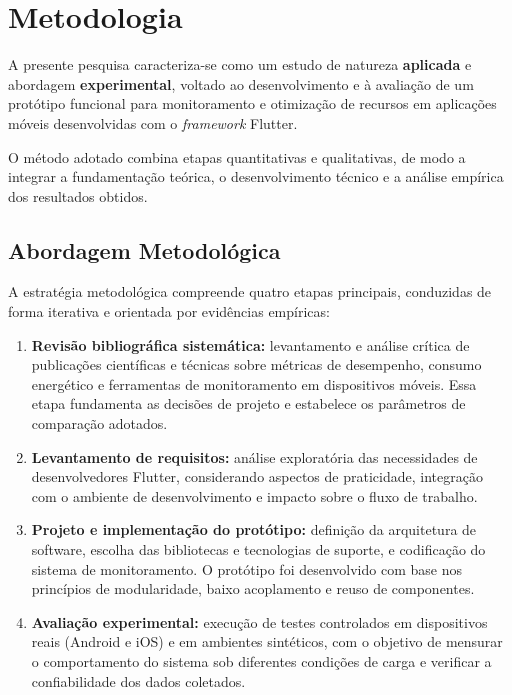 \documentclass[12pt,a4paper,oneside]{abntex2}
\begin{document}
\chapter{Metodologia}

A presente pesquisa caracteriza-se como um estudo de natureza \textbf{aplicada} e abordagem \textbf{experimental}, voltado ao desenvolvimento e à avaliação de um protótipo funcional para monitoramento e otimização de recursos em aplicações móveis desenvolvidas com o \textit{framework} Flutter. 

O método adotado combina etapas quantitativas e qualitativas, de modo a integrar a fundamentação teórica, o desenvolvimento técnico e a análise empírica dos resultados obtidos.

\section{Abordagem Metodológica}

A estratégia metodológica compreende quatro etapas principais, conduzidas de forma iterativa e orientada por evidências empíricas:

\begin{enumerate}
  \item \textbf{Revisão bibliográfica sistemática:} levantamento e análise crítica de publicações científicas e técnicas sobre métricas de desempenho, consumo energético e ferramentas de monitoramento em dispositivos móveis. Essa etapa fundamenta as decisões de projeto e estabelece os parâmetros de comparação adotados. 
  
  \item \textbf{Levantamento de requisitos:} análise exploratória das necessidades de desenvolvedores Flutter, considerando aspectos de praticidade, integração com o ambiente de desenvolvimento e impacto sobre o fluxo de trabalho. 

  \item \textbf{Projeto e implementação do protótipo:} definição da arquitetura de software, escolha das bibliotecas e tecnologias de suporte, e codificação do sistema de monitoramento. O protótipo foi desenvolvido com base nos princípios de modularidade, baixo acoplamento e reuso de componentes. 

  \item \textbf{Avaliação experimental:} execução de testes controlados em dispositivos reais (Android e iOS) e em ambientes sintéticos, com o objetivo de mensurar o comportamento do sistema sob diferentes condições de carga e verificar a confiabilidade dos dados coletados. 
\end{enumerate}
\end{document}
